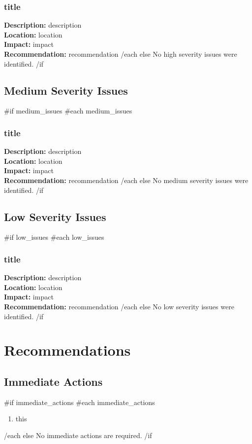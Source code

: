 \documentclass[11pt,a4paper]{article}
\begin{document}
\subsubsection{{{title}}}
\textbf{Description:} {{description}} \\
\textbf{Location:} {{location}} \\
\textbf{Impact:} {{impact}} \\
\textbf{Recommendation:} {{recommendation}}
{{/each}}
{{else}}
No high severity issues were identified.
{{/if}}

\subsection{Medium Severity Issues}
{{#if medium_issues}}
{{#each medium_issues}}
\subsubsection{{{title}}}
\textbf{Description:} {{description}} \\
\textbf{Location:} {{location}} \\
\textbf{Impact:} {{impact}} \\
\textbf{Recommendation:} {{recommendation}}
{{/each}}
{{else}}
No medium severity issues were identified.
{{/if}}

\subsection{Low Severity Issues}
{{#if low_issues}}
{{#each low_issues}}
\subsubsection{{{title}}}
\textbf{Description:} {{description}} \\
\textbf{Location:} {{location}} \\
\textbf{Impact:} {{impact}} \\
\textbf{Recommendation:} {{recommendation}}
{{/each}}
{{else}}
No low severity issues were identified.
{{/if}}

\section{Recommendations}

\subsection{Immediate Actions}
{{#if immediate_actions}}
{{#each immediate_actions}}
\begin{enumerate}
    \item {{this}}
\end{enumerate}
{{/each}}
{{else}}
No immediate actions are required.
{{/if}}
\end{document}
